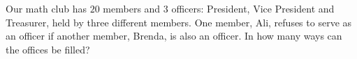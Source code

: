 Our math club has $20$ members and $3$ officers: President, Vice President and Treasurer, held by three different members. One member, Ali, refuses to serve as an officer if another member, Brenda, is also an officer. In how many ways can the offices be filled?
